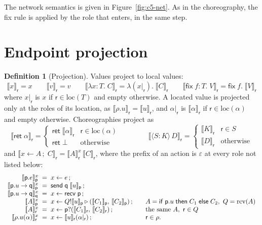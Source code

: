 \documentclass[11pt]{report}
\theoremstyle{plain}
\theoremstyle{definition}
\newtheorem{definition}[theorem]{Definition}
\theoremstyle{remark}
\newcommand{\kw}[1]{\mathsf{#1}}
\newcommand{\pp}{\mathsf{p}}
\newcommand{\qq}{\mathsf{q}}
\newcommand{\rr}{\mathsf{r}}
\newcommand{\bind}[3]{#1 \leftarrow #2\,;\;#3}
\newcommand{\cret}[1]{\kw{ret}\;#1}
\newcommand{\com}[3]{#1.#2 \to #3}
\newcommand{\cif}[4]{\kw{if}\;#1.#2\;\kw{then}\;#3\;\kw{else}\;#4}
\newcommand{\rt}[3]{\langle #1 : #2\rangle\,#3}
\newcommand{\rcv}[1]{\mathrm{rcv}(#1)}
\newcommand{\loc}[1]{\mathrm{loc}(#1)}
\newcommand{\nsend}[2]{\kw{send}\;#1\;#2}
\newcommand{\nrecv}[1]{\kw{recv}\;#1}
\newcommand{\sendbr}[4]{#1!#2 \mathbin{\triangleright} (#3,\,#4)}
\newcommand{\recvbr}[3]{#1?(#2,\,#3)}
\newcommand{\proj}[2]{\llbracket #1 \rrbracket_{#2}}
\newcommand{\pre}[3]{\llbracket #1 \rrbracket^{#2}_{#3}}
\newcommand{\clam}[3]{\lambda #1{:}#2.\;#3}
\newcommand{\cfix}[3]{\kw{fix}\;#1{:}#2.\;#3}
\newcommand{\nlam}[2]{\lambda(#1).\;#2}
\newcommand{\nfix}[2]{\kw{fix}\;#1.\;#2}
\begin{document}
The network semantics is given in Figure~\ref{fig:c5-net}.  As in the
choreography, the fix rule is applied by the role that enters, in the same
step.

\section{Endpoint projection}
\label{sec:c5-epp}

\begin{definition}[Projection]\label{def:c5-epp}
  Values project to local values:
  \[
    \proj{x}{\rr}=x
    \qquad
    \proj{v}{\rr}=v
    \qquad
    \proj{\clam{x}{T}{C}}{\rr}=\nlam{x|_\rr}{\proj{C}{\rr}}
    \qquad
    \proj{\cfix{f}{T}{V}}{\rr}=\nfix{f}{\proj{V}{\rr}}
  \]
  where $x|_\rr$ is $x$ if $\rr\in\loc{T}$ and empty otherwise.  A located
  value is projected only at the roles of its location, as
  $\proj{\rho.u}{\rr}=\proj{u}{\rr}$, and $\alpha|_\rr$ is
  $\proj{\alpha}{\rr}$ if $\rr\in\loc{\alpha}$ and empty otherwise.
  Choreographies project as
  \[
  \proj{\cret{\alpha}}{\rr} =
    \begin{cases}
      \kw{ret}\;\proj{\alpha}{\rr} & \rr\in\loc{\alpha}\\
      \kw{ret}\;\bot & \text{otherwise}
    \end{cases}
  \qquad
  \qquad
  \proj{\rt{S}{K}{D}}{\rr} =
    \begin{cases}
      \proj{K}{\rr} & \rr\in S\\
      \proj{D}{\rr} & \text{otherwise}
    \end{cases}
  \]
  and $\proj{\bind{x}{A}{C}}{\rr} = \pre{A}{x}{\rr}\,\proj{C}{\rr}$, where
  the prefix of an action is $\varepsilon$ at every role not listed
  below:
  \[
  \begin{array}{r@{\;\;=\;\;}l@{\qquad}l}
    \pre{\pp.e}{x}{\pp} & x\leftarrow e\,;\\
    \pre{\com{\pp}{u}{\qq}}{x}{\pp} & \nsend{\qq}{\proj{u}{\pp}}\,;\\
    \pre{\com{\pp}{u}{\qq}}{x}{\qq} & x\leftarrow\nrecv{\pp}\,;\\
    \pre{A}{x}{\pp} & x\leftarrow\sendbr{Q}{\proj{u}{\pp}}{\proj{C_1}{\pp}}{\proj{C_2}{\pp}}\,;
      & A=\cif{\pp}{u}{C_1}{C_2},\ Q=\rcv{A}\\
    \pre{A}{x}{\rr} & x\leftarrow\recvbr{\pp}{\proj{C_1}{\rr}}{\proj{C_2}{\rr}}\,;
      & \text{the same } A,\ \rr\in Q\\
    \pre{\rho.u(\alpha)}{x}{\rr} & x\leftarrow\proj{u}{\rr}(\alpha|_\rr)\,; & \rr\in\rho.
  \end{array}
  \]
\end{definition}
\end{document}

